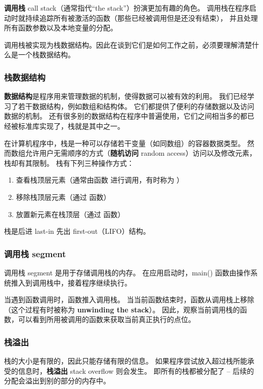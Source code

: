 \documentclass[../../LearnCpp.tex]{subfiles}
\begin{document}
\textbf{调用栈} call stack（通常指代“the stack”）扮演更加有趣的角色。
调用栈在程序启动时就持续追踪所有被激活的函数（那些已经被调用但是还没有结束），
并且处理所有函数参数以及本地变量的分配。

调用栈被实现为栈数据结构。因此在谈到它们是如何工作之前，必须要理解清楚什么是一个栈数据结构。

\subsubsection*{栈数据结构}

\textbf{数据结构}是程序用来管理数据的机制，使得数据可以被有效的利用。
我们已经学习了若干数据结构，例如数组和结构体。
它们都提供了便利的存储数据以及访问数据的机制。
还有很多别的数据结构在程序中普遍使用，它们之间相当多的都已经被标准库实现了，栈就是其中之一。

在计算机程序中，栈是一种可以存储若干变量（如同数组）的容器数据类型。
然而数组允许用户无需顺序的方式（\textbf{随机访问} random access）访问以及修改元素，栈却有其限制。
栈有下列三种操作方式：

\begin{enumerate}
  \item 查看栈顶层元素（通常由函数  进行调用，有时称为 ）
  \item 移除栈顶层元素（通过  函数）
  \item 放置新元素在栈顶层（通过  函数）
\end{enumerate}

栈是后进 last-in 先出 first-out（LIFO）结构。

\subsubsection*{调用栈 segment}

调用栈 segment 是用于存储调用栈的内存。
在应用启动时，main() 函数由操作系统推入到调用栈中，接着程序继续执行。

当遇到函数调用时，函数推入调用栈。
当当前函数结束时，函数从调用栈上移除（这个过程有时被称为 \textbf{unwinding the stack}）。
因此，观察当前调用栈的函数，可以看到所用被调用的函数来获取当前真正执行的点位。

\subsubsection*{栈溢出}

栈的大小是有限的，因此只能存储有限的信息。
如果程序尝试放入超过栈所能承受的信息时，\textbf{栈溢出} stack overflow 则会发生。
即所有的栈都被分配了 -- 后续的分配会溢出到别的部分的内存中。
\end{document}
